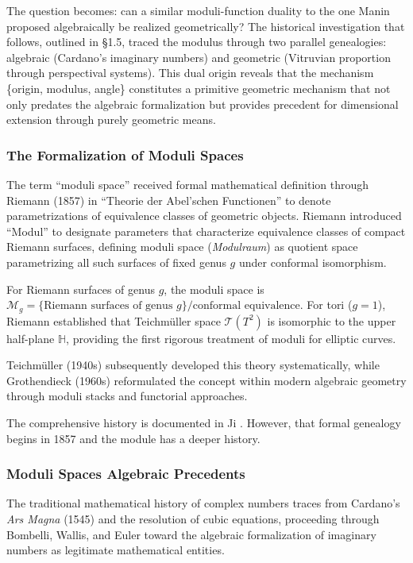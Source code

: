 The question becomes: can a similar moduli-function duality to the one Manin proposed algebraically be realized geometrically? The historical investigation that follows, outlined in \S 1.5, traced the modulus through two parallel genealogies: algebraic (Cardano's imaginary numbers) and geometric (Vitruvian proportion through perspectival systems). This dual origin reveals that the mechanism \{origin, modulus, angle\} constitutes a primitive geometric mechanism that not only predates the algebraic formalization but provides precedent for dimensional extension through purely geometric means.

\subsubsection{The Formalization of Moduli Spaces}

The term ``moduli space'' received formal mathematical definition through Riemann (1857) in ``Theorie der Abel'schen Functionen'' \cite{Riemann1857} to denote parametrizations of equivalence classes of geometric objects. Riemann introduced ``Modul'' to designate parameters that characterize equivalence classes of compact Riemann surfaces, defining moduli space (\textit{Modulraum}) as quotient space parametrizing all such surfaces of fixed genus $g$ under conformal isomorphism.

For Riemann surfaces of genus $g$, the moduli space is $\mathcal{M}_g = \{\text{Riemann surfaces of genus } g\}/\text{conformal equivalence}$. For tori ($g=1$), Riemann established that Teichmüller space $\mathcal{T}(T^2)$ is isomorphic to the upper half-plane $\mathbb{H}$, providing the first rigorous treatment of moduli for elliptic curves.

Teichmüller (1940s) subsequently developed this theory systematically, while Grothendieck (1960s) reformulated the concept within modern algebraic geometry through moduli stacks and functorial approaches.

The comprehensive history is documented in Ji \cite{Ji2015}. However, that formal genealogy begins in 1857 and the module has a deeper history.

\subsubsection{Moduli Spaces Algebraic Precedents}

The traditional mathematical history of complex numbers traces from Cardano's \textit{Ars Magna} (1545) and the resolution of cubic equations, proceeding through Bombelli, Wallis, and Euler toward the algebraic formalization of imaginary numbers as legitimate mathematical entities.

